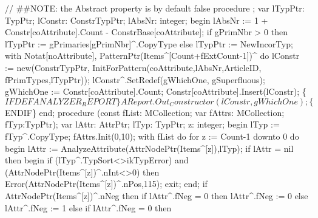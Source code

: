 \nwenddocs{}\endmoddef\nwstartdeflinemarkup{}\nwenddeflinemarkup
// ##NOTE: the Abstract property is by default false
procedure ;
var
   lTypPtr: TypPtr;
   lConstr: ConstrTypPtr;
   lAbsNr: integer;
begin
   lAbsNr :=  1 + Constr[coAttribute].Count - ConstrBase[coAttribute];
   if gPrimNbr > 0 then lTypPtr := gPrimaries[gPrimNbr]^.CopyType
   else lTypPtr := NewIncorTyp;
   with Notat[noAttribute], PatternPtr(Items^[Count+fExtCount-1])^ do
   lConstr :=  new(ConstrTypPtr,
                   InitForPattern(coAttribute,lAbsNr,ArticleID,
                                  fPrimTypes,lTypPtr));
   lConstr^.SetRedef(gWhichOne, gSuperfluous);
   gWhichOne :=  Constr[coAttribute].Count;
   Constr[coAttribute].Insert(lConstr);
   \{$IFDEF ANALYZER_REPORT\}
   AReport.Out_Constructor(lConstr, gWhichOne);
   \{$ENDIF\}
end;
\eatline
{}\nwendcode{}\nwdocspar
\nwenddocs{}\endmoddef\nwstartdeflinemarkup{}\nwenddeflinemarkup
procedure (const fList: MCollection;
                         var fAttrs: MCollection;
                         fTyp:TypPtr);
var
   lAttr: AttrPtr;
   lTyp: TypPtr;
   z: integer;
begin
   lTyp := fTyp^.CopyType;
   fAttrs.Init(0,10);
   with fList do
      for z := Count-1 downto 0 do
      begin
         lAttr := AnalyzeAttribute(AttrNodePtr(Items^[z]),lTyp);
         if lAttr = nil then
         begin
            if (lTyp^.TypSort<>ikTypError) and (AttrNodePtr(Items^[z])^.nInt<>0) then
               Error(AttrNodePtr(Items^[z])^.nPos,115);
            exit;
         end;
         if AttrNodePtr(Items^[z])^.nNeg then
            if lAttr^.fNeg = 0 then
               lAttr^.fNeg := 0
            else lAttr^.fNeg := 1
            else if lAttr^.fNeg = 0 then
